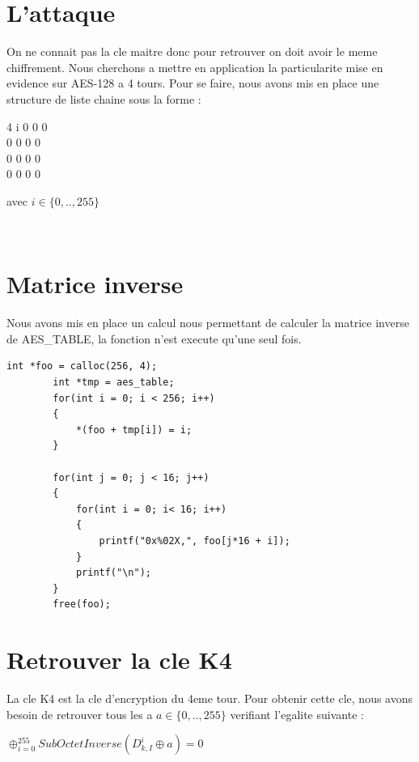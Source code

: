 \documentclass[10pt, a4paper]{report}
\begin{document}
	\section{L'attaque}
	On ne connait pas la cle maitre donc pour retrouver on doit avoir le meme chiffrement.
	Nous cherchons a mettre en application la particularite mise en evidence sur AES-128 a 4 tours. Pour se faire, nous avons mis en place une structure de liste chaine sous la forme : \\
	\begin{center}
		\begin{tabular}{4}
			i 0 0 0 \\ 0 0 0 0 \\ 0 0 0 0\\ 0 0 0 0\\
		\end{tabular}
		avec \begin{math}
			i \in \{0,..,255\}
		\end{math} \\
	\end{center}\\


	\section{Matrice inverse}
	Nous avons mis en place un calcul nous permettant de calculer la matrice inverse de AES\_TABLE, la fonction n'est execute qu'une seul fois.
	\begin{lstlisting}[style=CStyle]
		int *foo = calloc(256, 4);
		int *tmp = aes_table;
		for(int i = 0; i < 256; i++)
		{
			*(foo + tmp[i]) = i;
		}
		
		for(int j = 0; j < 16; j++)
		{
			for(int i = 0; i< 16; i++)
			{
				printf("0x%02X,", foo[j*16 + i]);
			}
			printf("\n");
		}
		free(foo);
	\end{lstlisting}

	
	\section{Retrouver la cle K4}
	La cle K4 est la cle d'encryption du 4eme tour. Pour obtenir cette cle, nous avons besoin de retrouver tous les a 
	 \begin{math}
		a \in \{0,..,255\}
	\end{math} verifiant l'egalite suivante : \\ 
	\begin{center}
		\large{\begin{math}
					\oplus^{255}_{i=0} SubOctetInverse(D_{k,I}^i\oplus a) = 0
		\end{math}}\\
	\end{center}
	
\end{document}
